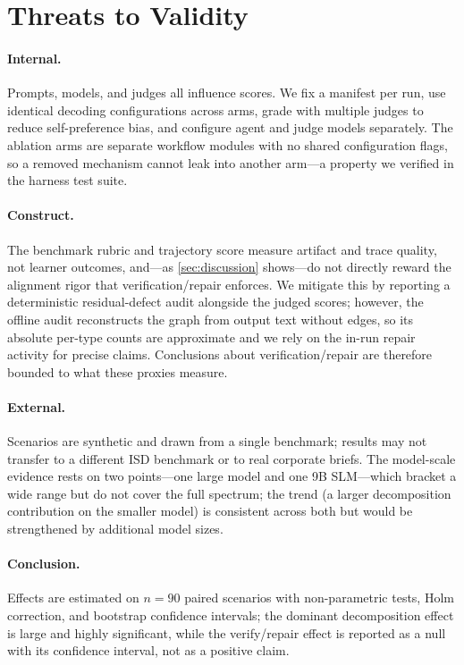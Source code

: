 \section{Threats to Validity}
\label{sec:threats-limitations}

\paragraph{Internal.}
Prompts, models, and judges all influence scores. We fix a manifest per run, use
identical decoding configurations across arms, grade with multiple judges to reduce
self-preference bias, and configure agent and judge models separately. The ablation
arms are separate workflow modules with no shared configuration flags, so a removed
mechanism cannot leak into another arm---a property we verified in the harness test
suite.

\paragraph{Construct.}
The benchmark rubric and trajectory score measure artifact and trace quality, not
learner outcomes, and---as \cref{sec:discussion} shows---do not directly reward the
alignment rigor that verification/repair enforces. We mitigate this by reporting a
deterministic residual-defect audit alongside the judged scores; however, the
offline audit reconstructs the graph from output text without edges, so its
absolute per-type counts are approximate and we rely on the in-run repair activity
for precise claims. Conclusions about verification/repair are therefore bounded to
what these proxies measure.

\paragraph{External.}
Scenarios are synthetic and drawn from a single benchmark; results may not transfer
to a different ISD benchmark or to real corporate briefs. The model-scale evidence
rests on two points---one large model and one 9B SLM---which bracket a wide range but
do not cover the full spectrum; the trend (a larger decomposition contribution on the
smaller model) is consistent across both but would be strengthened by additional model
sizes.

\paragraph{Conclusion.}
Effects are estimated on $n=90$ paired scenarios with non-parametric tests, Holm
correction, and bootstrap confidence intervals; the dominant decomposition effect
is large and highly significant, while the verify/repair effect is reported as a
null with its confidence interval, not as a positive claim.

